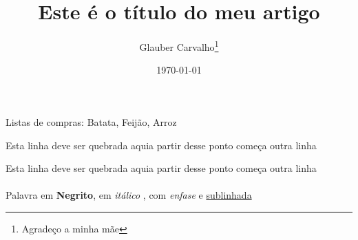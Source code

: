 \documentclass[12pt, a4paper]{article}	%
\title{Este é o título do meu artigo}	%
\author{Glauber Carvalho\thanks{Agradeço a minha mãe}}	%
\date{\today}	%
\begin{document}
	\setlength{\parindent}{2cm}
	\lipsum[1]
	\noindent\lipsum[1]
	\newpage
	\lipsum[2]
	\vspace{2cm}
	Listas de compras: Batata\hspace{1cm}, Feijão\hspace{1cm}, Arroz
	
	Esta linha deve ser quebrada aqui\hfill\break a partir desse ponto começa outra linha
	
	Esta linha deve ser quebrada aqui\newline a partir desse ponto começa outra linha
	\\\\
	Palavra em \textbf{Negrito}, em \textit{itálico} , com \emph{enfase} e \underline{sublinhada}
	
		
\end{document}
